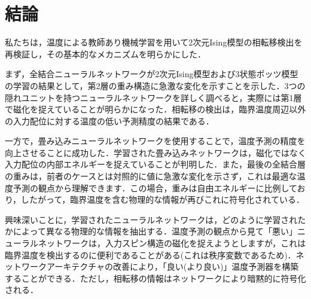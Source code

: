 \documentclass[a4paper,11pt]{jsarticle}
\begin{document}
\section{結論}
私たちは，温度による教師あり機械学習を用いて2次元Ising模型の相転移検出を再検証し，その基本的なメカニズムを明らかにした．\par
まず，全結合ニューラルネットワークが2次元Ising模型および3状態ポッツ模型の学習の結果として，第2層の重み構造に急激な変化を示すことを示した．3つの隠れユニットを持つニューラルネットワークを詳しく調べると，実際には第1層で磁化を捉えていることが明らかになった．相転移の検出は，臨界温度周辺以外の入力配位に対する温度の低い予測精度の結果である．\par
一方で，畳み込みニューラルネットワークを使用することで，温度予測の精度を向上させることに成功した．学習された畳み込みネットワークは，磁化ではなく入力配位の内部エネルギーを捉えていることが判明した．また，最後の全結合層の重みは，前者のケースとは対照的に値に急激な変化を示さず，これは最適な温度予測の観点から理解できます．この場合，重みは自由エネルギーに比例しており，したがって，臨界温度を含む物理的な情報が再びこれに符号化されている．\par
興味深いことに，学習されたニューラルネットワークは，どのように学習されたかによって異なる物理的な情報を抽出する．温度予測の観点から見て「悪い」ニューラルネットワークは，入力スピン構造の磁化を捉えようとしますが，これは臨界温度を検出するのに便利であることがある(これは秩序変数であるため)．ネットワークアーキテクチャの改善により，「良い(より良い)」温度予測器を構築することができる．ただし，相転移の情報はネットワークにより暗黙的に符号化される．
\end{document}
